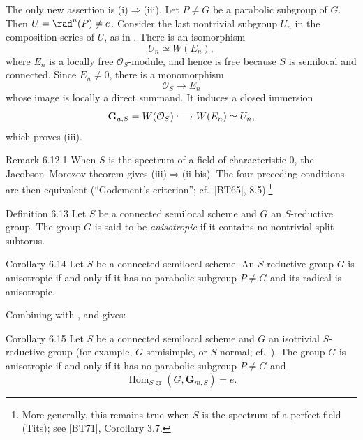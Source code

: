 The only new assertion is
\textup{(i)}\(\Rightarrow\)\textup{(iii)}.  Let \(P\ne G\) be a
parabolic subgroup of \(G\).  Then \(U=\rad^u(P)\ne e\).  Consider
the last nontrivial subgroup \(U_n\) in the composition series of
\(U\), as in .  There is an isomorphism
\[
 U_n\simeq W(E_n),
\]
where \(E_n\) is a locally free \(\mathcal O_S\)-module, and hence
is free because \(S\) is semilocal and connected.  Since
\(E_n\ne0\), there is a monomorphism
\[
 \mathcal O_S\longrightarrow E_n
\]
whose image is locally a direct summand.  It induces a closed
immersion
\[
 \mathbf G_{a,S}=W(\mathcal O_S)
   \lhook\joinrel\longrightarrow W(E_n)\simeq U_n,
\]
which proves \textup{(iii)}.

\begin{sgastatement}{Remark 6.12.1}
When \(S\) is the spectrum of a field of characteristic \(0\), the
Jacobson--Morozov theorem gives
\textup{(iii)}\(\Rightarrow\)\textup{(ii bis)}.  The four preceding
conditions are then equivalent \textup{(``Godement's criterion'';
cf.\ \textup{[BT65]}, 8.5)}.\footnote{More generally, this remains
true when \(S\) is the spectrum of a perfect field \textup{(Tits)};
see \textup{[BT71]}, Corollary 3.7.}
\end{sgastatement}

\begin{sgastatement}{Definition 6.13}
Let \(S\) be a connected semilocal scheme and \(G\) an
\(S\)-reductive group.  The group \(G\) is said to be
\emph{anisotropic} if it contains no nontrivial split subtorus.
\end{sgastatement}

\begin{sgastatement}{Corollary 6.14}
Let \(S\) be a connected semilocal scheme.  An \(S\)-reductive group
\(G\) is anisotropic if and only if it has no parabolic subgroup
\(P\ne G\) and its radical is anisotropic.
\end{sgastatement}

Combining  with , and  gives:

\begin{sgastatement}{Corollary 6.15}
Let \(S\) be a connected semilocal scheme and \(G\) an isotrivial
\(S\)-reductive group \textup{(for example, \(G\) semisimple, or
\(S\) normal; cf.\ )}.  The group \(G\) is anisotropic
if and only if it has no parabolic subgroup \(P\ne G\) and
\[
 \operatorname{Hom}_{S\text{-}\mathrm{gr}}
   (G,\mathbf G_{m,S})=e.
\]
\end{sgastatement}

